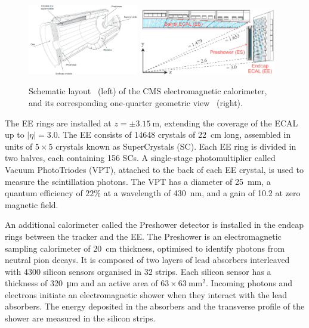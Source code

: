 \begin{figure}[!htbp]
 \centering
 \includegraphics[width=0.43\textwidth]{Figures/Experiment/CMS/ECALLayout_1.png}
 \includegraphics[width=0.53\textwidth]{Figures/Experiment/CMS/ECALLayout_2.png}
 \caption{Schematic layout~\cite{CMS} (left) of the CMS electromagnetic calorimeter, and its corresponding one-quarter geometric view~\cite{CMSECAL} (right).}
 \label{fig:CMS_ECAL}
\end{figure}

The EE rings are installed at $z = {\pm}\SI{3.15}{\m}$, extending the coverage of the ECAL up to $|\eta| = 3.0$. The EE consists of 14648 crystals of \SI{22}{\cm} long, assembled in units of $5{\times}5$ crystals known as SuperCrystals (SC). Each EE ring is divided in two halves, each containing 156 SCs. A single-stage photomultiplier called Vacuum PhotoTriodes (VPT), attached to the back of each EE crystal, is used to measure the scintillation photons. The VPT has a diameter of \SI{25}{\mm}, a quantum efficiency of $22\%$ at a wavelength of \SI{430}{\nm}, and a gain of 10.2 at zero magnetic field.

An additional calorimeter called the Preshower detector is installed in the endcap rings between the tracker and the EE. The Preshower is an electromagnetic sampling calorimeter of \SI{20}{\cm} thickness,  optimised to identify photons from neutral pion decays. It is composed of two layers of lead absorbers interleaved with 4300 silicon sensors organised in 32 strips. Each silicon sensor has a thickness of \SI{320}{\um} and an active area of $63{\times}\SI{63}{\mm\squared}$. Incoming photons and electrons initiate an electromagnetic shower when they interact with the lead absorbers. The energy deposited in the absorbers and the transverse profile of the shower are measured in the silicon strips.

